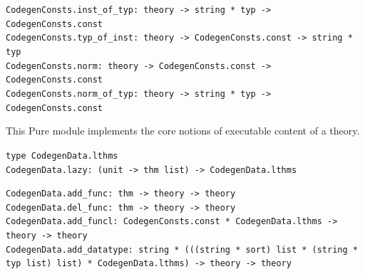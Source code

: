 \begin{isabellebody}
\begin{isamarkuptext}
\begin{mldecls}
  \verb|CodegenConsts.inst_of_typ: theory -> string * typ -> CodegenConsts.const| \\
  \verb|CodegenConsts.typ_of_inst: theory -> CodegenConsts.const -> string * typ| \\
  \verb|CodegenConsts.norm: theory -> CodegenConsts.const -> CodegenConsts.const| \\
  \verb|CodegenConsts.norm_of_typ: theory -> string * typ -> CodegenConsts.const|
  \end{mldecls}%
\end{isamarkuptext}%
\isamarkuptrue%
%
\endisatagmlref
{\isafoldmlref}%
%
\isadelimmlref
%
\endisadelimmlref
%
\isamarkuptrue%
%
\begin{isamarkuptext}%
This Pure module implements the core notions of
  executable content of a theory.%
\end{isamarkuptext}%
\isamarkuptrue%
%
\isamarkuptrue%
%
\isadelimmlref
%
\endisadelimmlref
%
\isatagmlref
%
\begin{isamarkuptext}%
\begin{mldecls}
  \verb|type CodegenData.lthms| \\
  \verb|CodegenData.lazy: (unit -> thm list) -> CodegenData.lthms|
  \end{mldecls}%
\end{isamarkuptext}%
\isamarkuptrue%
%
\endisatagmlref
{\isafoldmlref}%
%
\isadelimmlref
%
\endisadelimmlref
%
\isamarkuptrue%
%
\isadelimmlref
%
\endisadelimmlref
%
\isatagmlref
%
\begin{isamarkuptext}%
\begin{mldecls}
  \verb|CodegenData.add_func: thm -> theory -> theory| \\
  \verb|CodegenData.del_func: thm -> theory -> theory| \\
  \verb|CodegenData.add_funcl: CodegenConsts.const * CodegenData.lthms -> theory -> theory| \\
  \verb|CodegenData.add_datatype: string * (((string * sort) list * (string * typ list) list) * CodegenData.lthms) -> theory -> theory| \\

\end{mldecls}
\end{isamarkuptext}
\end{isabellebody}
